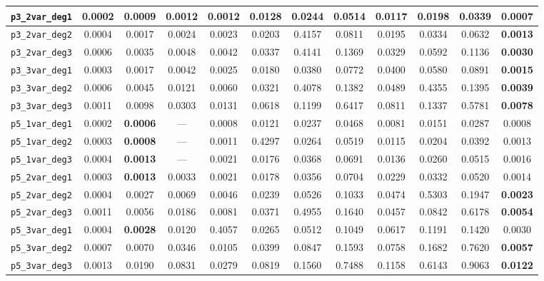 \begin{landscape}
\begin{table}[H]
{\begin{tabular}{lccccccccccc}
\hline
\texttt{p3\_2var\_deg1} & 0.0002 & 0.0009 & 0.0012 & 0.0012 & 0.0128 & 0.0244 & 0.0514 & 0.0117 & 0.0198 & 0.0339 & \textbf{0.0007} \\
\hline
\texttt{p3\_2var\_deg2} & 0.0004 & 0.0017 & 0.0024 & 0.0023 & 0.0203 & 0.4157 & 0.0811 & 0.0195 & 0.0334 & 0.0632 & \textbf{0.0013} \\
\hline
\texttt{p3\_2var\_deg3} & 0.0006 & 0.0035 & 0.0048 & 0.0042 & 0.0337 & 0.4141 & 0.1369 & 0.0329 & 0.0592 & 0.1136 & \textbf{0.0030} \\
\hline
\texttt{p3\_3var\_deg1} & 0.0003 & 0.0017 & 0.0042 & 0.0025 & 0.0180 & 0.0380 & 0.0772 & 0.0400 & 0.0580 & 0.0891 & \textbf{0.0015} \\
\hline
\texttt{p3\_3var\_deg2} & 0.0006 & 0.0045 & 0.0121 & 0.0060 & 0.0321 & 0.4078 & 0.1382 & 0.0489 & 0.4355 & 0.1395 & \textbf{0.0039} \\
\hline
\texttt{p3\_3var\_deg3} & 0.0011 & 0.0098 & 0.0303 & 0.0131 & 0.0618 & 0.1199 & 0.6417 & 0.0811 & 0.1337 & 0.5781 & \textbf{0.0078} \\
\hline
\texttt{p5\_1var\_deg1} & 0.0002 & \textbf{0.0006} & --- & 0.0008 & 0.0121 & 0.0237 & 0.0468 & 0.0081 & 0.0151 & 0.0287 & 0.0008 \\
\hline
\texttt{p5\_1var\_deg2} & 0.0003 & \textbf{0.0008} & --- & 0.0011 & 0.4297 & 0.0264 & 0.0519 & 0.0115 & 0.0204 & 0.0392 & 0.0013 \\
\hline
\texttt{p5\_1var\_deg3} & 0.0004 & \textbf{0.0013} & --- & 0.0021 & 0.0176 & 0.0368 & 0.0691 & 0.0136 & 0.0260 & 0.0515 & 0.0016 \\
\hline
\texttt{p5\_2var\_deg1} & 0.0003 & \textbf{0.0013} & 0.0033 & 0.0021 & 0.0178 & 0.0356 & 0.0704 & 0.0229 & 0.0332 & 0.0520 & 0.0014 \\
\hline
\texttt{p5\_2var\_deg2} & 0.0004 & 0.0027 & 0.0069 & 0.0046 & 0.0239 & 0.0526 & 0.1033 & 0.0474 & 0.5303 & 0.1947 & \textbf{0.0023} \\
\hline
\texttt{p5\_2var\_deg3} & 0.0011 & 0.0056 & 0.0186 & 0.0081 & 0.0371 & 0.4955 & 0.1640 & 0.0457 & 0.0842 & 0.6178 & \textbf{0.0054} \\
\hline
\texttt{p5\_3var\_deg1} & 0.0004 & \textbf{0.0028} & 0.0120 & 0.4057 & 0.0265 & 0.0512 & 0.1049 & 0.0617 & 0.1191 & 0.1420 & 0.0030 \\
\hline
\texttt{p5\_3var\_deg2} & 0.0007 & 0.0070 & 0.0346 & 0.0105 & 0.0399 & 0.0847 & 0.1593 & 0.0758 & 0.1682 & 0.7620 & \textbf{0.0057} \\
\hline
\texttt{p5\_3var\_deg3} & 0.0013 & 0.0190 & 0.0831 & 0.0279 & 0.0819 & 0.1560 & 0.7488 & 0.1158 & 0.6143 & 0.9063 & \textbf{0.0122} \\
\bottomrule
\end{tabular}
}%
\end{table}
\end{landscape}

